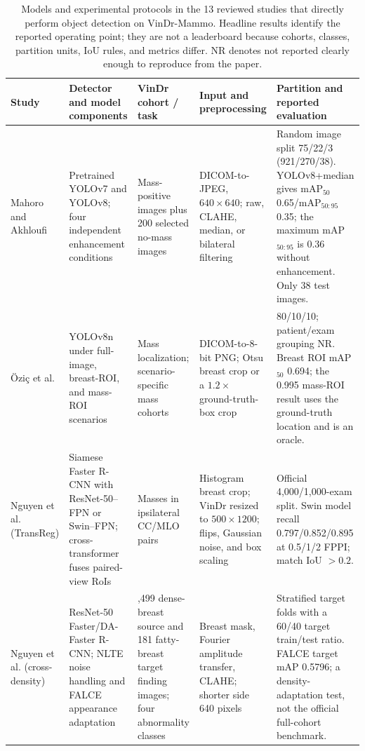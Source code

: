 \begin{table}[t]
\centering
\caption{Models and experimental protocols in the 13 reviewed studies that directly perform object detection on VinDr-Mammo. Headline results identify the reported operating point; they are not a leaderboard because cohorts, classes, partition units, IoU rules, and metrics differ. NR denotes not reported clearly enough to reproduce from the paper.}
\label{tab:vindr_detection_protocols}
\scriptsize
\setlength{\tabcolsep}{2.6pt}
\renewcommand{\arraystretch}{1.13}
\begin{threeparttable}
\begin{tabularx}{\textwidth}{@{}>{\raggedright\arraybackslash}p{2.05cm}>{\raggedright\arraybackslash}p{3.35cm}>{\raggedright\arraybackslash}p{2.55cm}>{\raggedright\arraybackslash}p{2.75cm}X@{}}
\toprule
Study & Detector and model components & VinDr cohort / task & Input and preprocessing & Partition and reported evaluation \\
\midrule
Mahoro and Akhloufi \cite{mahoro2023oneshot} & Pretrained YOLOv7 and YOLOv8; four independent enhancement conditions & Mass-positive images plus 200 selected no-mass images & DICOM-to-JPEG, $640\!\times\!640$; raw, CLAHE, median, or bilateral filtering & Random image split 75/22/3 (921/270/38). YOLOv8+median gives mAP$_{50}$ 0.65/mAP$_{50:95}$ 0.35; the maximum mAP$_{50:95}$ is 0.36 without enhancement. Only 38 test images. \\
\"{O}zi\c{c} et al. \cite{ozic2023scenarios} & YOLOv8n under full-image, breast-ROI, and mass-ROI scenarios & Mass localization; scenario-specific mass cohorts & DICOM-to-8-bit PNG; Otsu breast crop or a $1.2\times$ ground-truth-box crop & 80/10/10; patient/exam grouping NR. Breast ROI mAP$_{50}$ 0.694; the 0.995 mass-ROI result uses the ground-truth location and is an oracle. \\
Nguyen et al. (TransReg) \cite{nguyen2023transreg} & Siamese Faster R-CNN with ResNet-50--FPN or Swin--FPN; cross-transformer fuses paired-view RoIs & Masses in ipsilateral CC/MLO pairs & Histogram breast crop; VinDr resized to $500\!\times\!1200$; flips, Gaussian noise, and box scaling & Official 4,000/1,000-exam split. Swin model recall 0.797/0.852/0.895 at 0.5/1/2 FPPI; match IoU $>0.2$. \\
Nguyen et al. (cross-density) \cite{nguyen2023crossdensity} & ResNet-50 Faster/DA-Faster R-CNN; NLTE noise handling and FALCE appearance adaptation & 1,499 dense-breast source and 181 fatty-breast target finding images; four abnormality classes & Breast mask, Fourier amplitude transfer, CLAHE; shorter side 640 pixels & Stratified target folds with a 60/40 target train/test ratio. FALCE target mAP 0.5796; a density-adaptation test, not the official full-cohort benchmark. \\

\end{tabularx}
\end{threeparttable}
\end{table}
